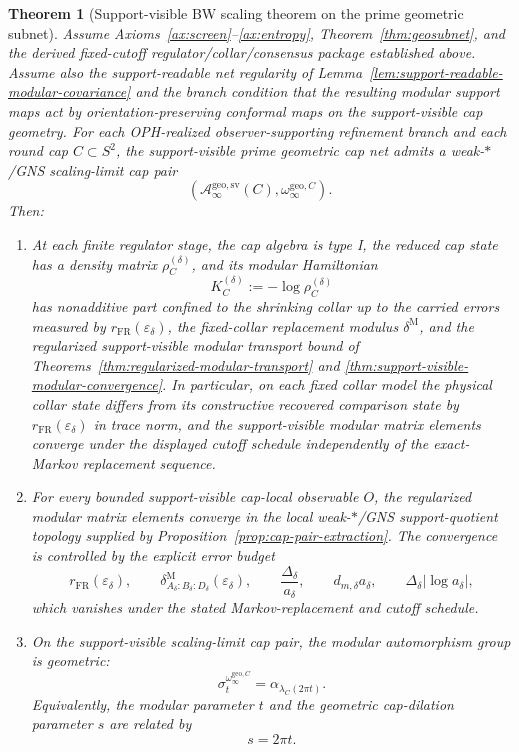 \documentclass[11pt]{article}
\newtheorem{theorem}{Theorem}[section]
\begin{document}
\begin{theorem}[Support-visible BW scaling theorem on the prime geometric subnet]\label{thm:bw}
Assume Axioms~\ref{ax:screen}--\ref{ax:entropy}, Theorem~\ref{thm:geosubnet}, and the derived fixed-cutoff regulator/collar/consensus package established above. Assume also the support-readable net regularity of Lemma~\ref{lem:support-readable-modular-covariance} and the branch condition that the resulting modular support maps act by orientation-preserving conformal maps on the support-visible cap geometry. For each OPH-realized observer-supporting refinement branch and each round cap \(C\subset S^2\), the support-visible prime geometric cap net admits a weak-\(*\)/GNS scaling-limit cap pair
\[
(\mathcal A_\infty^{\mathrm{geo,sv}}(C),\omega_\infty^{\mathrm{geo},C}).
\]
Then:
\begin{enumerate}[label=\textup{(\roman*)},leftmargin=2em]
\item At each finite regulator stage, the cap algebra is type I, the reduced cap state has a density matrix \(\rho_C^{(\delta)}\), and its modular Hamiltonian
\[
K_C^{(\delta)}:=-\log \rho_C^{(\delta)}
\]
has nonadditive part confined to the shrinking collar up to the carried errors measured by \(r_{\mathrm{FR}}(\varepsilon_\delta)\), the fixed-collar replacement modulus \(\delta^{\mathrm M}\), and the regularized support-visible modular transport bound of Theorems~\ref{thm:regularized-modular-transport} and \ref{thm:support-visible-modular-convergence}. In particular, on each fixed collar model the physical collar state differs from its constructive recovered comparison state by \(r_{\mathrm{FR}}(\varepsilon_\delta)\) in trace norm, and the support-visible modular matrix elements converge under the displayed cutoff schedule independently of the exact-Markov replacement sequence.

\item For every bounded support-visible cap-local observable \(O\), the regularized modular
matrix elements converge in the local weak-\(*\)/GNS support-quotient topology supplied by
Proposition~\ref{prop:cap-pair-extraction}. The convergence is controlled by the explicit error
budget
\[
r_{\mathrm{FR}}(\varepsilon_\delta),\qquad
\delta^{\mathrm M}_{A_\delta:B_\delta:D_\delta}(\varepsilon_\delta),\qquad
\frac{\Delta_\delta}{a_\delta},\qquad
d_{m,\delta}a_\delta,\qquad
\Delta_\delta|\log a_\delta|,
\]
which vanishes under the stated Markov-replacement and cutoff schedule.

\item On the support-visible scaling-limit cap pair, the modular automorphism group is geometric:
\[
\sigma_t^{\omega_\infty^{\mathrm{geo},C}}
=
\alpha_{\lambda_C(2\pi t)}.
\]
Equivalently, the modular parameter \(t\) and the geometric cap-dilation parameter \(s\) are related by
\[
s=2\pi t.
\]


\end{enumerate}
\end{theorem}
\end{document}
